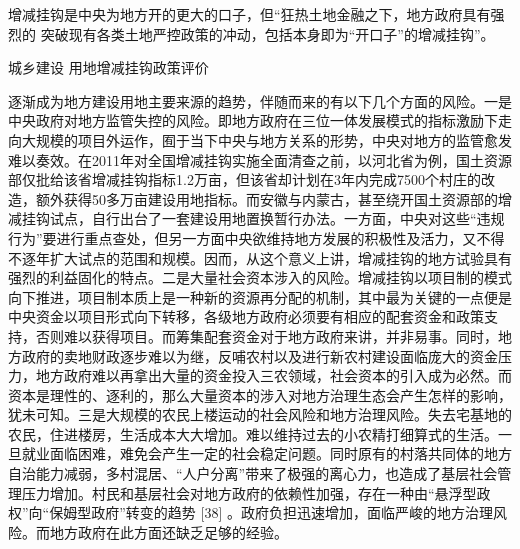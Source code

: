 增减挂钩是中央为地方开的更大的口子，但“狂热土地金融之下，地方政府具有强烈的
突破现有各类土地严控政策的冲动，包括本身即为“开口子”的增减挂钩”。

城乡建设
用地增减挂钩政策评价

逐渐成为地方建设用地主要来源的趋势，伴随而来的有以下几个方面的风险。一是中央政府对地方监管失控的风险。即地方政府在三位一体发展模式的指标激励下走向大规模的项目外运作，囿于当下中央与地方关系的形势，中央对地方的监管愈发难以奏效。在2011年对全国增减挂钩实施全面清查之前，以河北省为例，国土资源部仅批给该省增减挂钩指标1.2万亩，但该省却计划在3年内完成7500个村庄的改造，额外获得50多万亩建设用地指标。而安徽与内蒙古，甚至绕开国土资源部的增减挂钩试点，自行出台了一套建设用地置换暂行办法。一方面，中央对这些“违规行为”要进行重点查处，但另一方面中央欲维持地方发展的积极性及活力，又不得不逐年扩大试点的范围和规模。因而，从这个意义上讲，增减挂钩的地方试验具有强烈的利益固化的特点。二是大量社会资本涉入的风险。增减挂钩以项目制的模式向下推进，项目制本质上是一种新的资源再分配的机制，其中最为关键的一点便是中央资金以项目形式向下转移，各级地方政府必须要有相应的配套资金和政策支持，否则难以获得项目。而筹集配套资金对于地方政府来讲，并非易事。同时，地方政府的卖地财政逐步难以为继，反哺农村以及进行新农村建设面临庞大的资金压力，地方政府难以再拿出大量的资金投入三农领域，社会资本的引入成为必然。而资本是理性的、逐利的，那么大量资本的涉入对地方治理生态会产生怎样的影响，犹未可知。三是大规模的农民上楼运动的社会风险和地方治理风险。失去宅基地的农民，住进楼房，生活成本大大增加。难以维持过去的小农精打细算式的生活。一旦就业面临困难，难免会产生一定的社会稳定问题。同时原有的村落共同体的地方自治能力减弱，多村混居、“人户分离”带来了极强的离心力，也造成了基层社会管理压力增加。村民和基层社会对地方政府的依赖性加强，存在一种由“悬浮型政权”向“保姆型政府”转变的趋势 [38] 。政府负担迅速增加，面临严峻的地方治理风险。而地方政府在此方面还缺乏足够的经验。





